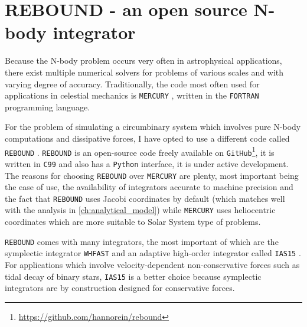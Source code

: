 \documentclass[twoside,openright,titlepage,numbers=noenddot,headinclude,%
                footinclude=true,cleardoublepage=empty,abstractoff, 
                BCOR=5mm,paper=a4,fontsize=11pt,%
                american,%
                ]{scrreprt}%
\begin{document}
\section{REBOUND - an open source N-body integrator}
\label{sec:REBOUND - an open source N-body integrator}
Because the N-body problem occurs very often in astrophysical applications,
there exist multiple numerical solvers for problems of various scales and 
with varying degree of accuracy. Traditionally, the code most often used for applications
in celestial mechanics is \texttt{MERCURY} \citep{chambers1997,chambers1999}, 
written in the \texttt{FORTRAN} programming language.

For the problem of simulating a circumbinary system
which involves pure N-body computations and dissipative forces, I have 
opted to use a different code called \texttt{REBOUND} \citep{Rein2012}.
\texttt{REBOUND} is an open-source code freely available on \texttt{GitHub}\footnote{
    \url{https://github.com/hannorein/rebound}}, it is written in \texttt{C99}
and also has a \texttt{Python} interface, it is under active development.
The reasons for choosing \texttt{REBOUND} over \texttt{MERCURY} are plenty,
most important being the ease of use, the availability of 
integrators accurate to machine precision  and the fact that 
\texttt{REBOUND} uses Jacobi coordinates
by default (which matches well with the analysis in \cref{ch:analytical_model})
while \texttt{MERCURY} uses heliocentric coordinates which are more suitable to
Solar System type of problems.

\texttt{REBOUND} comes with many integrators, the most important of which
are the symplectic integrator \texttt{WHFAST} \citep{Rein2015} and an
adaptive high-order integrator called \texttt{IAS15} \citep{Rein2014}. For
applications which involve velocity-dependent non-conservative forces
such as tidal decay of binary stars, \texttt{IAS15} is a better choice
because symplectic integrators are by construction
designed for conservative forces. 
\end{document}
